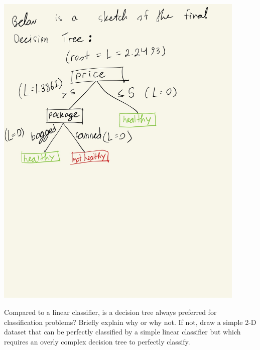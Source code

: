\begin{solution}
    \includegraphics[width=12cm]{images/P1_A_3.JPG} \\
\end{solution}

\problem[4]
Compared to a linear classifier, is a decision tree always preferred for classification problems? Briefly explain why or why not. If not, draw a simple 2-D dataset that can be perfectly classified by a simple linear classifier but which requires an overly complex decision tree to perfectly classify.

